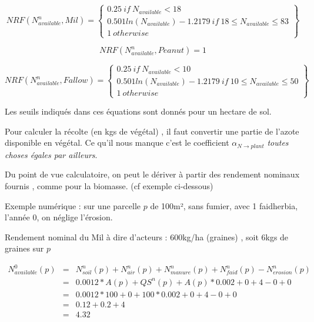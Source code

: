 \documentclass[10pt,a4paper,french]{article} %
\begin{document}
\begin{equation}
  NRF(N_{available}^n,Mil)=\left\{
                \begin{array}{ll}
                  0.25 \ if \ N_{available} < 18\\
                0.501 ln(N_{available})-1.2179 \ if \ 18 \leq N_{available} \leq 83  \\
                  1 \ otherwise
                \end{array}
              \right\} 
 \end{equation} 

\begin{equation}
   NRF(N_{available}^n,Peanut)=1
  \end{equation} 
 

 \begin{equation}
   NRF(N_{available}^n,Fallow)=\left\{
                \begin{array}{ll}
                  0.25 \ if \ N_{available} < 10\\
                0.501 ln(N_{available})-1.2179 \ if \ 10 \leq N_{available} \leq 50  \\
                  1 \ otherwise
                \end{array}
              \right\}
  \end{equation} 
  
  


Les seuils indiqués dans ces équations sont donnés pour un hectare de sol.





Pour calculer la récolte (en kgs de végétal) , il faut convertir une partie de l'azote disponible en végétal.
Ce qu'il nous manque c'est le coefficient $\alpha_{N \rightarrow plant}$  \emph{toutes choses égales par ailleurs}. 



Du point de vue calculatoire, on peut le dériver à partir des rendement nominaux fournis , comme pour la biomasse. (cf exemple ci-dessous)

Exemple numérique : 
sur une parcelle $p$ de 100m², sans fumier, avec 1 faidherbia, l'année 0, on néglige l'érosion.

Rendement nominal du Mil à dire d'acteurs : 600kg/ha (graines) , soit 6kgs de graines sur $p$

\begin{eqnarray*}
N_{available}^{0}(p)&=&N_{soil}^{n}(p)  +N_{air}^{n}(p)+N_{manure}^{n}(p)+N_{faid}^{n}(p)-N_{erosion}^n(p)  \\
                    &=& 0.0012 * A(p) + QS^{n}(p) + A(p) * 0.002 +0                +4              -0                + 0  \\
                    &=&  0.0012 * 100 + 0 + 100 * 0.002 +0+4-0 + 0  \\
                    &=&  0.12 + 0.2 +4  \\
                    &=& 4.32
\end{eqnarray*}
\end{document}
